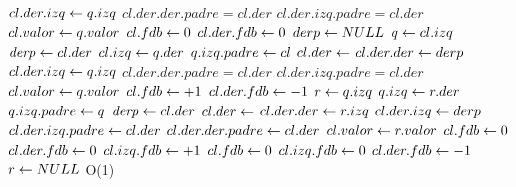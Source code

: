 {			\State $cl.der.izq \leftarrow q.izq$
			\State $cl.der.der.padre = cl.der$
			\State $cl.der.izq.padre = cl.der$
			\State $cl.valor \leftarrow q.valor$
			\State $cl.fdb \leftarrow 0$
			\State $cl.der.fdb \leftarrow 0$
			\State $derp \leftarrow NULL$
		\Else
			\State $\text{\textit{q}} \leftarrow cl.izq$
			\State {} 
				\State $\text{\textit{derp}} \leftarrow cl.der$
				\State $cl.izq \leftarrow q.der$
				\State $q.izq.padre \leftarrow cl$
				\State $cl.der \leftarrow $
				\State $cl.der.der \leftarrow derp$
				\State $cl.der.izq \leftarrow q.izq$
				\State $cl.der.der.padre = cl.der$
				\State $cl.der.izq.padre = cl.der$
				\State $cl.valor \leftarrow q.valor$
				\State $cl.fdb \leftarrow +1$
				\State $cl.der.fdb \leftarrow -1$
			\Else
				\State {} 
					\State $\text{\textit{r}} \leftarrow q.izq$ 
					\State $q.izq \leftarrow r.der$
					\State $q.izq.padre \leftarrow q$
					\State $\text{\textit{derp}} \leftarrow cl.der$ 
					\State $cl.der \leftarrow $ 
					\State $cl.der.der \leftarrow r.izq$ 
					\State $cl.der.izq \leftarrow derp$ 
					\State $cl.der.izq.padre \leftarrow cl.der$ 
					\State $cl.der.der.padre \leftarrow cl.der$ 
					\State $cl.valor \leftarrow r.valor$ 
					\State {} 
						\State $cl.fdb \leftarrow 0$ 
						\State $cl.der.fdb \leftarrow 0$ 
						\State $cl.izq.fdb \leftarrow +1$ 
					\Else
						\State $cl.fdb \leftarrow 0$ 
						\State $cl.izq.fdb \leftarrow 0$ 
						\State $cl.der.fdb \leftarrow -1$ 
					\EndIf
					\State $r \leftarrow NULL$ 
				\EndIf
			\EndIf
		\EndIf
	\EndIf
}
{O(1)}

